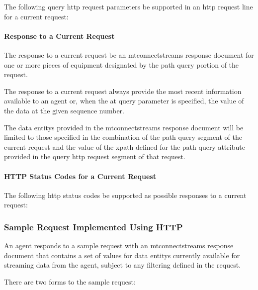 The following \gls{query http request} parameters \MUST be supported in an \gls{http request line} for a \gls{current request}:



\paragraph{Response to a Current Request}\mbox{}

The \gls{response} to a \gls{current request} \SHOULD be an \gls{mtconnectstreams response document} for one or more pieces of equipment designated by the \gls{path query} portion of the \gls{request}.

The \gls{response} to a \gls{current request} \MUST always provide the most recent information available to an \gls{agent} or, when the \gls{at query} parameter is specified, the value of the data at the given \gls{sequence number}.

The \glspl{data entity} provided in the \gls{mtconnectstreams response document} will be limited to those specified in the combination of the \gls{path query} segment of the \gls{current request} and the value of the \gls{xpath} defined for the \gls{path query} attribute provided in the \gls{query http request} segment of that \gls{request}. 

\paragraph{HTTP Status Codes for a Current Request}\mbox{}

The following \glspl{http status code} \MUST be supported as possible responses to a \gls{current request}:



\subsubsection{Sample Request Implemented Using HTTP}

An \gls{agent} responds to a \gls{sample request} with an \gls{mtconnectstreams response document} that contains a set of values for \glspl{data entity} currently available for \gls{streaming data} from the \gls{agent}, subject to any filtering defined in the \gls{request}.

There are two forms to the \gls{sample request}:

